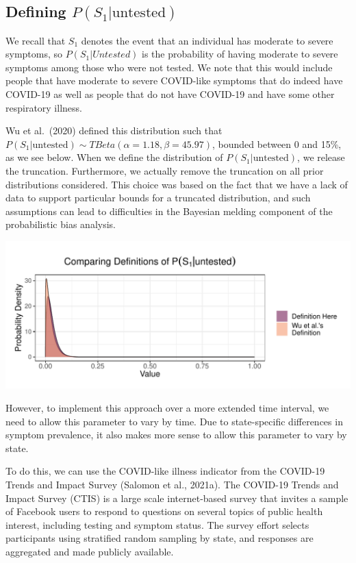 \documentclass[12pt,twoside]{smiththesis}
\begin{document}
\hypertarget{defining-ps_1textuntested}{%
\subsection{\texorpdfstring{Defining \(P(S_1|\text{untested})\)}{Defining P(S\_1\textbar\textbackslash text\{untested\})}}\label{defining-ps_1textuntested}}

We recall that \(S_1\) denotes the event that an individual has moderate to severe symptoms, so
\(P(S_1|Untested)\) is the probability of having moderate to severe symptoms among those who were not tested. We note that this would include people that have moderate to severe COVID-like symptoms that do indeed have COVID-19 as well as people that do not have COVID-19 and have some other respiratory illness.

Wu et al.~(2020) defined this distribution such that \(P(S_1|\text{untested}) \sim TBeta(\alpha = 1.18, \beta = 45.97)\), bounded between 0 and 15\%, as we see below. When we define the distribution of \(P(S_1|\text{untested})\), we release the truncation. Furthermore, we actually remove the truncation on all prior distributions considered. This choice was based on the fact that we have a lack of data to support particular bounds for a truncated distribution, and such assumptions can lead to difficulties in the Bayesian melding component of the probabilistic bias analysis.
\begin{center}\includegraphics[width=1\linewidth]{thesis_files/figure-latex/unnamed-chunk-55-1} \end{center}

However, to implement this approach over a more extended time interval, we need to allow this parameter to vary by time. Due to state-specific differences in symptom prevalence, it also makes more sense to allow this parameter to vary by state.

To do this, we can use the COVID-like illness indicator from the COVID-19 Trends and Impact Survey (Salomon et al., 2021a). The COVID-19 Trends and Impact Survey (CTIS) is a large scale internet-based survey that invites a sample of Facebook users to respond to questions on several topics of public health interest, including testing and symptom status. The survey effort selects participants using stratified random sampling by state, and responses are aggregated and made publicly available.
\end{document}
